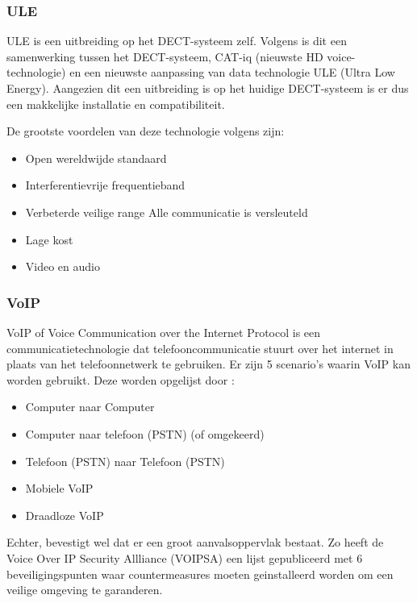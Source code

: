 \subsubsection{ULE}

ULE is een uitbreiding op het DECT-systeem zelf. Volgens \textcite{GariniDil2014} is dit een samenwerking tussen het DECT-systeem, CAT-iq (nieuwste HD voice-technologie) en een nieuwste aanpassing van data technologie ULE (Ultra Low Energy). Aangezien dit een uitbreiding is op het huidige DECT-systeem is er dus een makkelijke installatie en compatibiliteit.

De grootste voordelen van deze technologie volgens \textcite{GariniDil2014} zijn:

\begin{itemize}
  \item Open wereldwijde standaard
  \item Interferentievrije frequentieband
  \item Verbeterde veilige range
  \subitem Alle communicatie is versleuteld
  \item Lage kost
  \item Video en audio
\end{itemize}

\subsubsection{VoIP}

VoIP of Voice Communication over the Internet Protocol is een communicatietechnologie dat telefooncommunicatie stuurt over het internet in plaats van het telefoonnetwerk te gebruiken. \Autocite{Soenmez2018} Er zijn 5 scenario's waarin VoIP kan worden gebruikt. Deze worden opgelijst door \textcite{Soenmez2018}:

\begin{itemize}
  \item Computer naar Computer
  \item Computer naar telefoon (PSTN) (of omgekeerd)
  \item Telefoon (PSTN) naar Telefoon (PSTN)
  \item Mobiele VoIP
  \item Draadloze VoIP
\end{itemize}

Echter, \textcite{Soenmez2018} bevestigt wel dat er een groot aanvalsoppervlak bestaat. Zo heeft de Voice Over IP Security Allliance (VOIPSA) een lijst gepubliceerd met 6 beveiligingspunten waar countermeasures moeten geinstalleerd worden om een veilige omgeving te garanderen.

